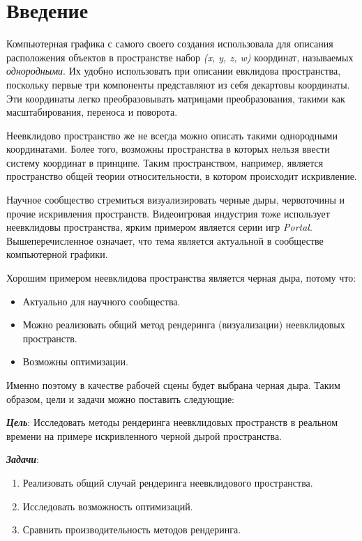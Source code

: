 \section{Введение}
\label{sec:Chapter0} 

Компьютерная графика с самого своего создания использовала для описания расположения объектов в пространстве набор \textit{(x, y, z, w)} координат, называемых \textit{однородными}. Их удобно использовать при описании евклидова пространства, поскольку первые три компоненты представляют из себя декартовы координаты. Эти координаты легко преобразовывать матрицами преобразования, такими как масштабирования, переноса и поворота.

Неевклидово пространство же не всегда можно описать такими однородными координатами. Более того, возможны пространства в которых нельзя ввести систему координат в принципе. Таким пространством, например, является пространство общей теории относительности, в котором происходит искривление.

Научное сообщество стремиться визуализировать черные дыры, червоточины и прочие искривления пространств. Видеоигровая индустрия тоже использует неевклидовы пространства, ярким примером является серии игр \textit{Portal}. Вышеперечисленное означает, что тема является актуальной в сообществе компьютерной графики.

Хорошим примером неевклидова пространства является черная дыра, потому что:
\begin{itemize}
  \item Актуально для научного сообщества.
  \item Можно реализовать общий метод рендеринга (визуализации) неевклидовых \linebreak
  пространств.
  \item Возможны оптимизации.
\end{itemize}

Именно поэтому в качестве рабочей сцены будет выбрана черная дыра. Таким образом, цели и задачи можно поставить следующие:

\textbf{\textit{Цель}}: Исследовать методы рендеринга неевклидовых пространств в реальном времени на примере искривленного черной дырой пространства.

\newpage

\textbf{\textit{Задачи}}:
\begin{enumerate}
  \item Реализовать общий случай рендеринга неевклидового пространства.
  \item Исследовать возможность оптимизаций.
  \item Сравнить производительность методов рендеринга.
\end{enumerate}

